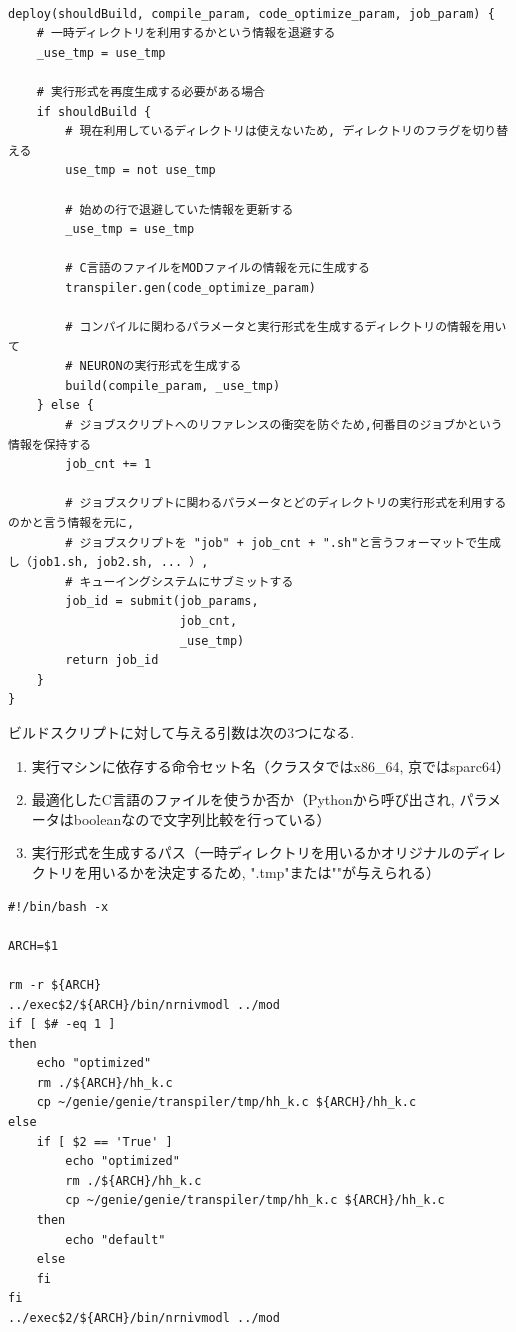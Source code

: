 {\footnotesize
\begin{lstlisting}[caption=ジョブのサブミット 疑似コード, frame=single]

deploy(shouldBuild, compile_param, code_optimize_param, job_param) {
    # 一時ディレクトリを利用するかという情報を退避する
    _use_tmp = use_tmp

    # 実行形式を再度生成する必要がある場合
    if shouldBuild {
        # 現在利用しているディレクトリは使えないため, ディレクトリのフラグを切り替える
        use_tmp = not use_tmp

        # 始めの行で退避していた情報を更新する
        _use_tmp = use_tmp

        # C言語のファイルをMODファイルの情報を元に生成する
        transpiler.gen(code_optimize_param)

        # コンパイルに関わるパラメータと実行形式を生成するディレクトリの情報を用いて
        # NEURONの実行形式を生成する
        build(compile_param, _use_tmp)
    } else {
        # ジョブスクリプトへのリファレンスの衝突を防ぐため,何番目のジョブかという情報を保持する
        job_cnt += 1

        # ジョブスクリプトに関わるパラメータとどのディレクトリの実行形式を利用するのかと言う情報を元に,
        # ジョブスクリプトを "job" + job_cnt + ".sh"と言うフォーマットで生成し（job1.sh, job2.sh, ... ）,
        # キューイングシステムにサブミットする
        job_id = submit(job_params,
                        job_cnt,
                        _use_tmp)
        return job_id
    }
}
\end{lstlisting}
}

ビルドスクリプトに対して与える引数は次の3つになる.\\
\begin{enumerate}
\item 実行マシンに依存する命令セット名（クラスタではx86\_64, 京ではsparc64）
\item 最適化したC言語のファイルを使うか否か（Pythonから呼び出され, パラメータはbooleanなので文字列比較を行っている）
\item 実行形式を生成するパス（一時ディレクトリを用いるかオリジナルのディレクトリを用いるかを決定するため, ".tmp"または""が与えられる）
\end{enumerate}
{\footnotesize
\begin{lstlisting}[caption=実行形式のビルドスクリプト, frame=single]
#!/bin/bash -x

ARCH=$1

rm -r ${ARCH}
../exec$2/${ARCH}/bin/nrnivmodl ../mod
if [ $# -eq 1 ]
then
    echo "optimized"
    rm ./${ARCH}/hh_k.c
    cp ~/genie/genie/transpiler/tmp/hh_k.c ${ARCH}/hh_k.c
else
    if [ $2 == 'True' ]
        echo "optimized"
        rm ./${ARCH}/hh_k.c
        cp ~/genie/genie/transpiler/tmp/hh_k.c ${ARCH}/hh_k.c
    then
        echo "default"
    else
    fi
fi
../exec$2/${ARCH}/bin/nrnivmodl ../mod
\end{lstlisting}
}

